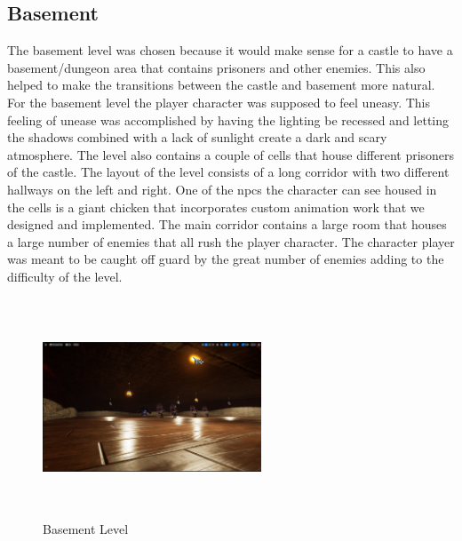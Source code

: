 \documentclass{sigchi}
\begin{document}
\subsection{Basement}
The basement level was chosen because it would make sense for a castle to have a basement/dungeon area that contains prisoners and other enemies. This also helped to make the transitions between the castle and basement more natural. For the basement level the player character was supposed to feel uneasy. This feeling of unease was accomplished by having the lighting be recessed and letting the shadows combined with a lack of sunlight create a dark and scary atmosphere. The level also contains a couple of cells that house different prisoners of the castle. The layout of the level consists of  a long corridor with two different hallways on the left and right. One of the npcs the character can see housed in the cells is a giant chicken that incorporates custom animation work that we designed and implemented. The main corridor contains a large room that houses a large number of enemies that all rush the player character. The character player was meant to be caught off guard by the great number of enemies adding to the difficulty of the level.
\begin{figure}


\includegraphics[width=6.5cm, height=6.5cm]{Figure/basement.png}
\caption{Basement Level}
\end{figure}
\end{document}
